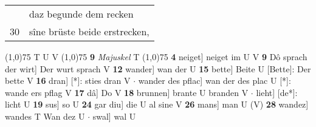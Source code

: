 \documentclass[8pt,a4paper,notitlepage]{article}
\begin{document}
\begin{table}[ht]
\begin{minipage}[t]{0.5\linewidth}
\begin{tabular}{rl}
 & daz begunde dem recken\\ 
30 & sîne brüste beide erstrecken,\\ 
\end{tabular}
\scriptsize
\line(1,0){75} \newline
T U V \newline
\line(1,0){75} \newline
\textbf{9} \textit{Majuskel} T  \newline
\line(1,0){75} \newline
\textbf{4} neiget] neiget im U V \textbf{9} Dô sprach der wirt] Der wurt sprach V \textbf{12} wander] wan der U \textbf{15} bette] Beite U [Bette]: Der bette V \textbf{16} dran] [*]: sties dran V  $\cdot$ wander des pflac] wan der des plac U [*]: wande ers pflag V \textbf{17} dâ] Do V \textbf{18} brunnen] brante U branden V  $\cdot$ lieht] [de*]: licht U \textbf{19} sus] so U \textbf{24} gar diu] die U al sine V \textbf{26} mans] man U (V) \textbf{28} wandez] wandes T Wan dez U  $\cdot$ swal] wal U \newline
\end{minipage}
\end{table}
\end{document}
